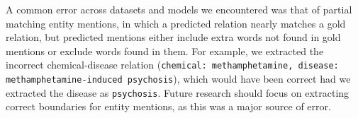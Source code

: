 \documentclass[11pt]{article}
\begin{document}


A common error across datasets and models we encountered was that of partial matching entity mentions, in which a predicted relation nearly matches a gold relation, but predicted mentions either include extra words not found in gold mentions or exclude words found in them.  For example, we extracted the incorrect chemical-disease relation  (\texttt{chemical: methamphetamine, disease: methamphetamine-induced psychosis}), which would have been correct had we extracted the disease as \texttt{psychosis}.  Future research should focus on extracting correct boundaries for entity mentions, as this was a major source of error. 
\end{document}

